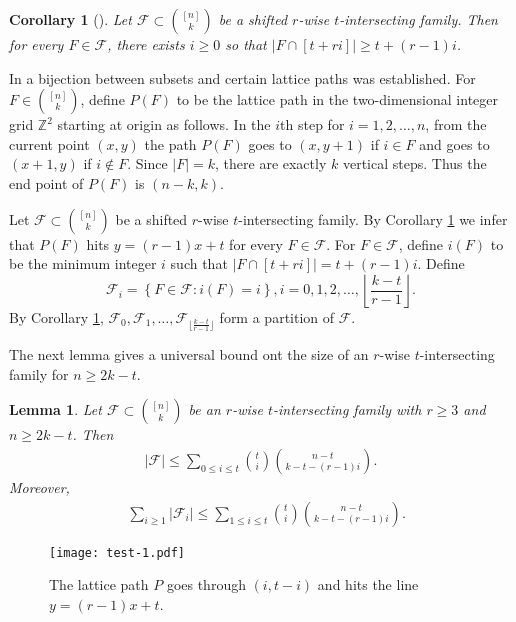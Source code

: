\documentclass[11pt,a4paper]{article}
\newtheorem{lem}[thm]{Lemma}
\newtheorem{false statement}{False statement}
\newtheorem{cor}[thm]{Corollary}
\theoremstyle{definition}
\def\hf{\mathcal{F}}
\begin{document}
\begin{cor} [\cite{F87}]\label{cor-2.2}
Let $\hf\subset \binom{[n]}{k}$ be a shifted $r$-wise $t$-intersecting family. Then for every $F\in \hf$, there exists $i\geq 0$ so that $|F\cap [t+ri]|\geq t+(r-1)i$.
\end{cor}

In \cite{F78} a bijection between subsets and certain lattice paths was established. For $F\in \binom{[n]}{k}$, define  $P(F)$ to be the lattice path in the two-dimensional integer grid $\mathbb{Z}^2$ starting at origin as follows. In the $i$th step for $i=1,2,\ldots,n$,  from the current point $(x,y)$ the path $P(F)$ goes to $(x,y+1)$ if $i\in F$ and goes to $(x+1,y)$ if $i\notin F$.  Since $|F|=k$, there are exactly $k$ vertical steps. Thus the end point of $P(F)$ is $(n-k,k)$.

Let $\hf\subset \binom{[n]}{k}$ be a shifted $r$-wise $t$-intersecting family. By Corollary \ref{cor-2.2} we infer that $P(F)$ hits $y=(r-1)x+t$ for every $F\in \hf$. For $F\in \hf$, define $i(F)$ to be the minimum integer $i$ such that $|F\cap [t+ri]|=t+(r-1)i$. Define
\[
\hf_i= \left\{F\in \hf\colon  i(F)=i \right\}, i=0,1,2,\ldots, \left\lfloor \frac{k-t}{r-1}\right\rfloor.
\]
By Corollary \ref{cor-2.2}, $\hf_0,\hf_1,\ldots,\hf_{\lfloor \frac{k-t}{r-1}\rfloor}$ form  a partition of $\hf$.

The next lemma gives a universal bound ont the size of an $r$-wise $t$-intersecting family for $n\geq 2k-t$.

\begin{lem}
Let  $\hf\subset \binom{[n]}{k}$ be an $r$-wise $t$-intersecting family with $r\geq 3$ and $n\geq 2k-t$. Then
\begin{align}
|\hf|   \leq \sum_{0\leq i\leq t} \binom{t}{i}\binom{n-t}{k-t-(r-1)i}.\label{ineq-key0}
\end{align}
Moreover,
\begin{align}
&\sum_{i\geq 1} |\hf_i|   \leq \sum_{1\leq i\leq t} \binom{t}{i}\binom{n-t}{k-t-(r-1)i}.\label{ineq-key1}
\end{align}
\end{lem}


 \begin{figure}[t]
  \centering
  \texttt{[image: test-1.pdf]}
  \caption{The lattice path $P$ goes through $(i,t-i)$ and hits the line $y=(r-1)x+t$.}\label{latticepath}
\end{figure}
\end{document}
